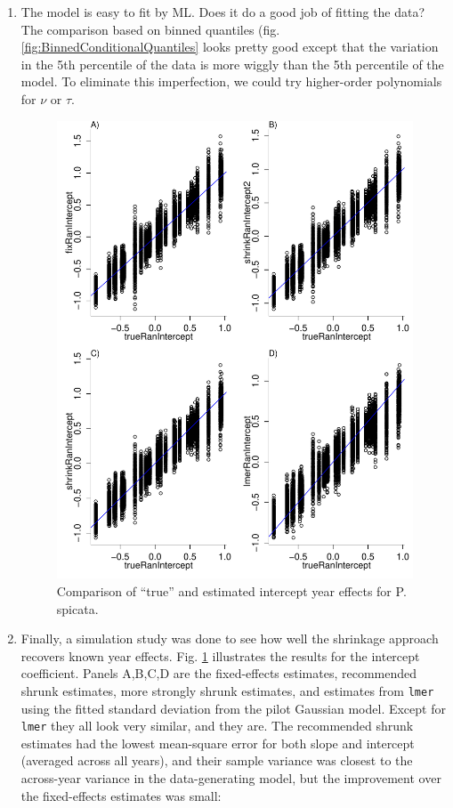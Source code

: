\documentclass[11pt]{article}
\begin{document}
{\begin{enumerate}
\item The model is easy to fit by ML. Does it do a good job of fitting the data? The comparison based on binned quantiles 
(fig. \ref{fig:BinnedConditionalQuantiles} looks pretty good except that the variation in the 5th percentile of the data
is more wiggly than the 5th percentile of the model. To eliminate this imperfection, we could try higher-order polynomials
for $\nu$ or $\tau$. 

\begin{figure}[tbp]
\centering
\includegraphics[width=.9\textwidth]{figures/PSSPShrinkageTest.pdf}
\caption{Comparison of ``true'' and estimated intercept year effects for {P. spicata}. }
\label{fig:ShrinkageTest}
\end{figure} 

\item Finally, a simulation study was done to see how well the shrinkage approach recovers known year effects. Fig. \ref{fig:ShrinkageTest}
illustrates the results for the intercept coefficient. Panels A,B,C,D are the fixed-effects estimates, recommended shrunk estimates,
more strongly shrunk estimates, and estimates from \texttt{lmer} using the fitted standard deviation from the pilot Gaussian model. 
Except for \texttt{lmer} they all look very similar, and they are. The recommended shrunk estimates had the lowest 
mean-square error for both slope and intercept (averaged across all years), and their sample variance was closest to the across-year 
variance in the data-generating model, but the improvement over the fixed-effects estimates was small: 


\end{enumerate}}
\end{document}
